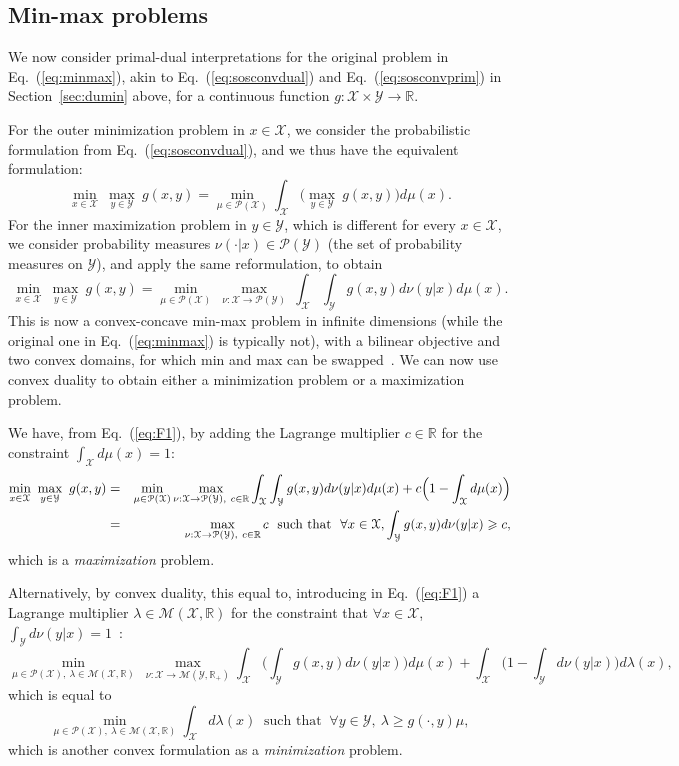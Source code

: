 \documentclass[11pt]{article}
\newcommand{\BEA}{\begin{eqnarray}}
\newcommand{\EEA}{\end{eqnarray}}
\newcommand{\BEQ}{\begin{equation}}
\newcommand{\EEQ}{\end{equation}}
\newcommand{\rb}{\mathbb{R}}
\newcommand{\mysec}[1]{Section~\ref{sec:#1}}
\newcommand{\eq}[1]{Eq.~(\ref{eq:#1})}
\def \X{{\mathcal X}}
\def \Y{{\mathcal Y}}
\def \ds{\displaystyle}
\begin{document}
\subsection{Min-max problems}
 \label{sec:duminmax}
We now consider primal-dual interpretations for the original problem in \eq{minmax}, akin to \eq{sosconvdual} and \eq{sosconvprim} in \mysec{dumin} above, for a continuous function $g: \X \times \Y \to \rb$.


For the outer minimization problem in $x \in \X$, we consider the probabilistic formulation from \eq{sosconvdual}, and we thus have the equivalent formulation:
\[
\min_{x \in \X}\  \max_{y \in \Y} \ g(x,y) = \min_{\mu \in \mathcal{P}(\X)} \int_\X  \Big( \max_{y \in \Y} \ g(x,y)  \Big) d\mu(x).
\]
For the inner maximization problem in $y \in \Y$, which is different for every $x \in \X$, we consider probability measures $\nu(\cdot|x) \in \mathcal{P}(\Y)$ (the set of probability measures on $\Y$), and apply the same reformulation, to obtain
\BEQ
\label{eq:F1}
\min_{x \in \X} \ \max_{y \in \Y} \ g(x,y) 
=
\min_{ \mu \in \mathcal{P}(\X)}\  \max_{ \nu: \X \to \mathcal{P}(\Y)} \ 
\int_\X \int_\Y g(x,y) d\nu(y|x)  d\mu(x).
\EEQ
This is now a convex-concave min-max problem in infinite dimensions (while the original one in \eq{minmax} is typically not), with a bilinear objective and two convex domains, for which min and max can be swapped~\cite{sion1958general,jahn2020introduction}.
  We can now use convex duality to obtain either a minimization problem or a maximization problem.


We have, from \eq{F1}, by adding the Lagrange multiplier $c \in \rb$ for the constraint  $\ds \int_\X d\mu(x) = 1$:
\BEA
\notag
\min_{x \in \X} \ \max_{y \in \Y} \ g(x,y) 
 &=  & \min_{ \mu \in \mathcal{P}(\X)} \max_{ \nu: \X \to \mathcal{P}(\Y), \ c \in \rb}
\int_\X \int_\Y g(x,y) d\nu(y|x)  d\mu(x) + c \Big( 1-\int_\X d\mu(x)  \Big)\\
\label{eq:33} & = & \!\!\!\!\max_{ \nu: \X \to \mathcal{P}(\Y), \ c \in \rb} c\ \mbox{ such that } \ \forall x\in \X,   \int_\Y g(x,y) d\nu(y|x)  \geqslant c,
\EEA
which is a \emph{maximization} problem.



Alternatively, by convex duality, this equal to,  introducing in \eq{F1} a Lagrange multiplier $ \lambda \in \mathcal{M}(\X,\rb)$ for the constraint that $\forall x \in \X$, $\int_\Y d\nu(y|x) = 1$~\cite{jahn2020introduction}:
 \[
  \min_{\mu \in \mathcal{P}(\X) ,  \ \lambda \in  \mathcal{M}(\X,\rb)  } \ \max_{ \nu: \X \to \mathcal{M}(\Y,\rb_+)}
  \int_\X \Big(  \int_\Y g(x,y) d\nu(y|x)    \Big) d\mu(x) + \int_\X \bigg( 1 - \int_\Y d\nu(y|x) \bigg) d\lambda(x)  ,
 \]
which is equal to
\BEQ
\label{eq:otd} \min_{ \mu \in \mathcal{P}(\X), \   \lambda \in  \mathcal{M}(\X,\rb)  } \int_\X  d\lambda(x) \ \mbox{ such that } \ \forall  y \in \Y, \  \lambda \geqslant g(\cdot,y) \mu,
 \EEQ
 which is another convex formulation as a \emph{minimization} problem.
 
\end{document}

